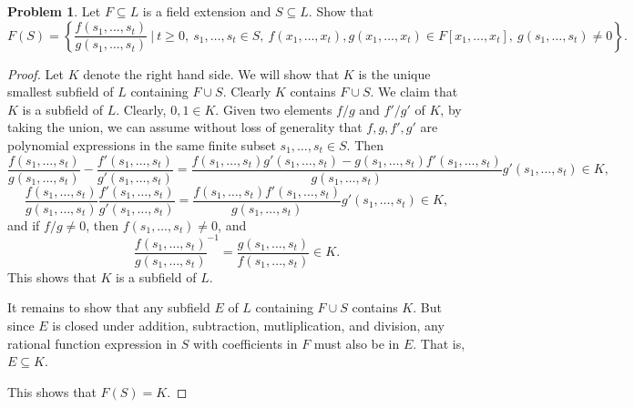 \documentclass[11pt]{article}
\theoremstyle{definition}
\newtheorem{problem}{Problem}
\begin{document}
\begin{problem} Let $F\subseteq L$ is a field extension and $S\subseteq L$. Show that  
\[ F(S) = \left\{ \frac{f(s_1,\dots,s_t)}{g(s_1,\dots,s_t)} \ \Big| \  t\geq 0, \ s_1,\dots,s_t\in S, \ f(x_1,\dots,x_t), g(x_1,\dots,x_t)\in F[x_1,\dots,x_t], \ g(s_1,\dots,s_t)\neq 0\right\}.\]
\end{problem}
\begin{proof}
Let $K$ denote the right hand side. We will show that $K$ is the unique smallest subfield of $L$ containing $F \cup S$. Clearly $K$ contains $F\cup S$. We claim that $K$ is a subfield of $L$. Clearly, $0,1\in K$. Given two elements $f/g$ and $f'/g'$ of $K$, by taking the union, we can assume without loss of generality that $f,g,f',g'$ are polynomial expressions in the same finite subset $s_1,\dots,s_t \in S$. Then
\[ \frac{f(s_1,\dots,s_t)}{g(s_1,\dots,s_t)} - \frac{f'(s_1,\dots,s_t)}{g'(s_1,\dots,s_t)} = \frac{f(s_1,\dots,s_t)g'(s_1,\dots,s_t)-g(s_1,\dots,s_t)f'(s_1,\dots,s_t)}{g(s_1,\dots,s_t)}{g'(s_1,\dots,s_t)} \in K,\]
\[ \frac{f(s_1,\dots,s_t)}{g(s_1,\dots,s_t)} \frac{f'(s_1,\dots,s_t)}{g'(s_1,\dots,s_t)} = \frac{f(s_1,\dots,s_t)f'(s_1,\dots,s_t)}{g(s_1,\dots,s_t)}{g'(s_1,\dots,s_t)} \in K,\]
and if $f/g\neq 0$, then $f(s_1,\dots,s_t)\neq 0$, and
\[ \frac{f(s_1,\dots,s_t)}{g(s_1,\dots,s_t)}^{-1} = \frac{g(s_1,\dots,s_t)}{f(s_1,\dots,s_t)} \in K.\]
This shows that $K$ is a subfield of $L$.

It remains to show that any subfield $E$ of $L$ containing $F\cup S$ contains $K$. But since $E$ is closed under addition, subtraction, mutliplication, and division, any rational function expression in $S$ with coefficients in $F$ must also be in $E$. That is, $E\subseteq K$.

This shows that $F(S)=K$.
\end{proof}
\end{document}
